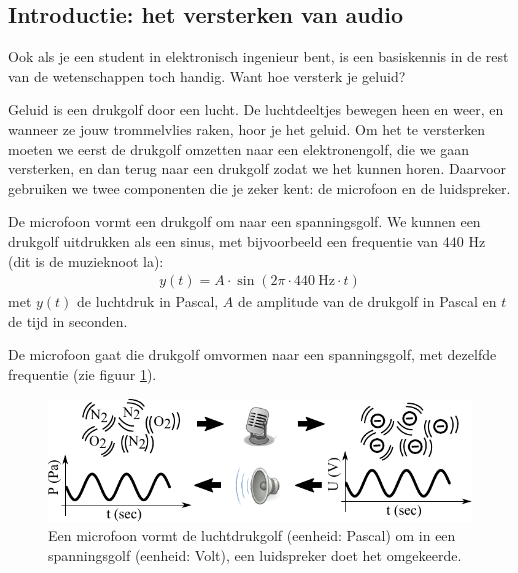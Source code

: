 \documentclass{article}
\begin{document}
		\subsection{Introductie: het versterken van audio}

			Ook als je een student in elektronisch ingenieur bent, is een basiskennis in de rest van de wetenschappen toch handig. Want hoe versterk je geluid?

			Geluid is een drukgolf door een lucht. De luchtdeeltjes bewegen heen en weer, en wanneer ze jouw trommelvlies raken, hoor je het geluid. Om het te versterken moeten we eerst de drukgolf omzetten naar een elektronengolf, die we gaan versterken, en dan terug naar een drukgolf zodat we het kunnen horen. Daarvoor gebruiken we twee componenten die je zeker kent: de microfoon en de luidspreker.



			De microfoon vormt een drukgolf om naar een spanningsgolf. We kunnen een drukgolf uitdrukken als een sinus, met bijvoorbeeld een frequentie van $440$ Hz (dit is de muzieknoot la):
			\begin{align}
				y(t) = A \cdot \sin (2\pi \cdot 440~\text{Hz} \cdot t)
			\end{align}
			met $y(t)$ de luchtdruk in Pascal, $A$ de amplitude van de drukgolf in Pascal en $t$ de tijd in seconden.

			De microfoon gaat die drukgolf omvormen naar een spanningsgolf, met dezelfde frequentie (zie figuur \ref{fig:micro}).
			\begin{figure}[htbp]
				\centering
				\includegraphics{micro}
				\caption{Een microfoon vormt de luchtdrukgolf (eenheid: Pascal) om in een spanningsgolf (eenheid: Volt), een luidspreker doet het omgekeerde.}
				\label{fig:micro}
			\end{figure}
\end{document}
